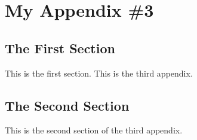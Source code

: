 \chapter{My Appendix \#3}
%

\section{The First Section}
This is the first section.
This is the third appendix.

\section{The Second Section}
This is the second section of the third appendix.


